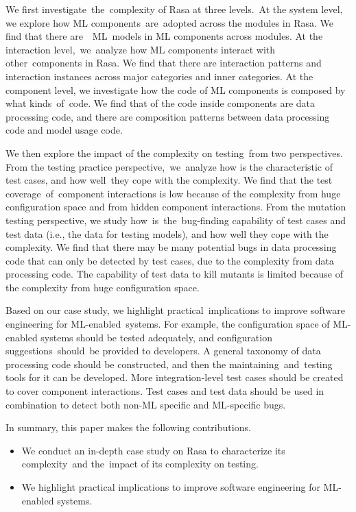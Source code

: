 We first investigate~the~complexity of Rasa at three levels.~At the system level, we explore how ML components~are~adopted across the modules in Rasa. We find that there are~~ML~models in  ML components across  modules. At the interaction level,~we~analyze how ML components interact with other~components in Rasa. We find that there are  interaction patterns and  interaction instances across  major categories and  inner categories. At the component level, we investigate how the code of ML components is composed by what kinds~of~code. We find that  of the code inside components are data processing code, and there are  composition patterns between data processing code and model usage code.

We then explore the impact of the complexity on testing~from two perspectives. From the testing practice perspective,~we~analyze how is the characteristic of test cases, and how well~they cope with the complexity. We find that the test coverage~of~component interactions is low because of the complexity from huge configuration space and from hidden component interactions. From the mutation testing perspective, we study how~is~the~bug-finding capability of test cases and test data (i.e., the data for testing models), and how well they cope with the complexity. 
We find that there may be many potential bugs in data processing code that can only be detected by test cases, due to the complexity from data processing code.
The capability of test data to kill mutants is limited because of the complexity from huge configuration space.

Based on our case study, we highlight practical~implications to improve software engineering for ML-enabled~systems. For example, the configuration space of ML-enabled systems should be tested adequately, and configuration suggestions~should~be provided to developers.  A general taxonomy of data processing code should be constructed, and then the maintaining~and~testing tools for it can be developed. More integration-level test cases should be created to cover component interactions. Test cases and test data should be used in combination to detect both non-ML specific and ML-specific bugs.

In summary, this paper makes the following contributions.

\begin{itemize}
\item We conduct an in-depth case study on Rasa to characterize its complexity~and the~impact of its complexity on testing.
\item We highlight practical implications to improve software engineering for ML-enabled systems.
\end{itemize}
